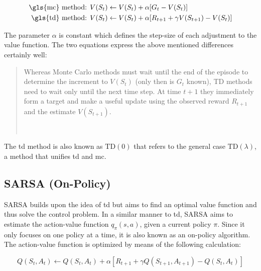\documentclass[draft,final]{vutinfth} %
\newcommand{\p}[1]{see p. #1}
\begin{document}
    \begin{equation}
        \begin{aligned}[t]
            \text{\gls{mc} method: } & V(S_t) \leftarrow V(S_t) + \alpha [G_t - V(S_t)]\\
            \text{\gls{td} method: } & V(S_t) \leftarrow V(S_t) + \alpha [R_{t+1} + \gamma V(S_{t+1})-V(S_t)]\\
        \end{aligned}\label{eq:td_versus_mc}
    \end{equation}

    The parameter $\alpha$ is constant which defines the step-size of each adjustment to the value function.
    The two equations express the above mentioned differences certainly well:

    \begin{quote}
        Whereas Monte Carlo methods must wait until the end of the episode to determine the increment to $V(S_t)$ (only then is $G_t$ known), TD methods need to wait only until the next time step.
        At time $t + 1$ they immediately form a target and make a useful update using the observed reward $R_{t+1}$ and the estimate $V(S_{t+1})$.

        \hfill~\cite[\p{120}]{sutton_reinforcement_2018}
    \end{quote}

    The \gls{td} method is also known as $\text{TD}(0)$ that refers to the general case $\text{TD}(\lambda)$, a method that unifies \gls{td} and \gls{mc}.

    \subsection{SARSA (On-Policy)}\label{subsec:sarsanullon-policynull}

    SARSA builds upon the idea of \gls{td} but aims to find an optimal value function and thus solve the control problem.
    In a similar manner to \gls{td}, SARSA aims to estimate the action-value function $q_\pi(s,a)$, given a current policy $\pi$.
    Since it only focuses on one policy at a time, it is also known as an on-policy algorithm.
    The action-value function is optimized by means of the following calculation:

    \begin{equation}
        Q(S_t,A_t) \leftarrow Q(S_t,A_t) + \alpha [R_{t+1} + \gamma Q(S_{t+1},A_{t+1}) - Q(S_{t},A_{t}) ]
    \end{equation}
\end{document}
